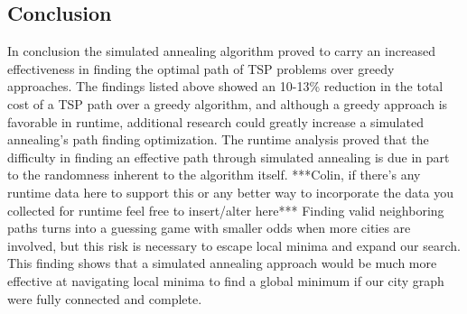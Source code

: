 \documentclass{article}
\begin{document}
\begin{multicols}{2}

    \section{Conclusion}

    In conclusion the simulated annealing algorithm proved to carry an increased effectiveness in finding the optimal path of TSP problems over greedy approaches.  The findings listed above showed an 10-13\% reduction in the total cost of a TSP path over a greedy algorithm, and although a greedy approach is favorable in runtime, additional research could greatly increase a simulated annealing’s path finding optimization.  The runtime analysis proved that the difficulty in finding an effective path through simulated annealing is due in part to the randomness inherent to the algorithm itself.  ***Colin, if there’s any runtime data here to support this or any better way to incorporate the data you collected for runtime feel free to insert/alter here*** Finding valid neighboring paths turns into a guessing game with smaller odds when more cities are involved, but this risk is necessary to escape local minima and expand our search.  This finding shows that a simulated annealing approach would be much more effective at navigating local minima to find a global minimum if our city graph were fully connected and complete.   

\end{multicols}
\end{document}
